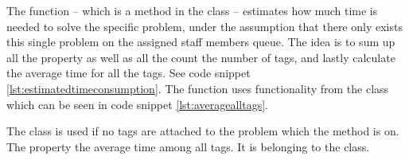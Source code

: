 The  function -- which is a method in the  class -- estimates how much time is needed to solve the specific problem, under the assumption that there only exists this single problem on the assigned staff members queue. The idea is to sum up all the  property as well as all the count the number of tags, and lastly calculate the average time for all the tags. See code snippet \ref{lst:estimatedtimeconsumption}. The  function uses functionality from the  class which can be seen in code snippet \ref{lst:averagealltags}.

The  class is used if no tags are attached to the problem which the  method is on.
The property  the average time among all tags.
It is belonging to the  class.